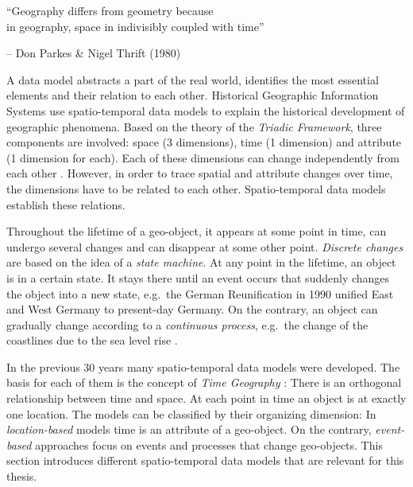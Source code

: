 \begin{quoteit}
  ``Geography differs from geometry because \\
  in geography, space in indivisibly coupled with time''
\end{quoteit}
\hfill -- Don Parkes \& Nigel Thrift (1980)

A data model abstracts a part of the real world, identifies the most essential elements and their relation to each other. Historical Geographic Information Systems use spatio-temporal data models to explain the historical development of geographic phenomena. Based on the theory of the \emph{Triadic Framework}, three components are involved: space (3 dimensions), time (1 dimension) and attribute (1 dimension for each). Each of these dimensions can change independently from each other
\cite[p. 53]{ott2001time}.
However, in order to trace spatial and attribute changes over time, the dimensions have to be related to each other. Spatio-temporal data models establish these relations.

Throughout the lifetime of a geo-object, it appears at some point in time, can undergo several changes and can disappear at some other point. \emph{Discrete changes} are based on the idea of a \emph{state machine}. At any point in the lifetime, an object is in a certain state. It stays there until an event occurs that suddenly changes the object into a new state, e.g.\ the German Reunification in 1990 unified East and West Germany to present-day Germany. On the contrary, an object can gradually change according to a \emph{continuous process}, e.g.\ the change of the coastlines due to the sea level rise
\cite{peuquet99}.

In the previous 30 years many spatio-temporal data models were developed. The basis for each of them is the concept of \emph{Time Geography}
\cite{haegerstrand1970}:
There is an orthogonal relationship between time and space. At each point in time an object is at exactly one location. The models can be classified by their organizing dimension: In \emph{location-based} models time is an attribute of a geo-object. On the contrary, \emph{event-based} approaches focus on events and processes that change geo-objects. This section introduces different spatio-temporal data models that are relevant for this thesis.


